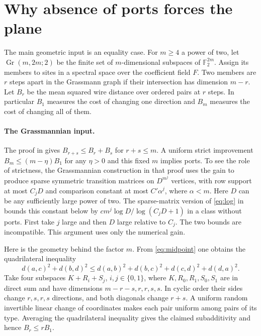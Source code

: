 \documentclass[11pt]{article}
\theoremstyle{definition}
\newcommand{\F}{\mathbb F}
\newcommand{\Gr}{\operatorname{Gr}}
\begin{document}
\appendix
\section{Why absence of ports forces the plane}
\label{app:plane}

The main geometric input is an equality case. For \(m\ge4\) a power of two,
let \(\Gr(m,2m;2)\) be the finite set of \(m\)-dimensional subspaces of
\(\F_2^{2m}\). Assign its members to sites in a spectral space over the
coefficient field \(F\). Two members are \(r\) steps apart in the
Grassmann graph if their intersection has dimension \(m-r\). Let \(B_r\)
be the mean squared wire distance over ordered pairs at \(r\) steps.
In particular \(B_1\) measures the cost of changing one direction and
\(B_m\) measures the cost of changing all of them.

\paragraph{The Grassmannian input.}
The proof in \cite{euclid} gives \(B_{r+s}\le B_r+B_s\) for
\(r+s\le m\). A uniform strict improvement \(B_m\le(m-\eta)B_1\) for any
\(\eta>0\) and this fixed \(m\) implies ports. To see the role of strictness,
the Grassmannian construction in that proof uses the gain to produce
sparse symmetric transition matrices on \(D^{m^j}\) vertices, with row
support at most \(C_jD\) and comparison constant at most \(C'\alpha^j\),
where \(\alpha<m\). Here \(D\) can be any sufficiently large power of two.
The sparse-matrix version of \eqref{eq:log} in \cite{circuits} bounds this
constant below by \(c m^j\log D/\log(C_jD+1)\) in a class without ports.
First take \(j\) large and then \(D\) large relative to \(C_j\). The two
bounds are incompatible. This argument uses only the numerical gain.

Here is the geometry behind the factor \(m\). From
\eqref{eq:midpoint} one obtains the quadrilateral inequality
\[
 d(a,c)^2+d(b,d)^2\le
 d(a,b)^2+d(b,c)^2+d(c,d)^2+d(d,a)^2 .
\]
Take four subspaces \(K+R_i+S_j\), \(i,j\in\{0,1\}\), where
\(K,R_0,R_1,S_0,S_1\) are in direct sum and have dimensions
\(m-r-s,r,r,s,s\). In cyclic order their sides change \(r,s,r,s\)
directions, and both diagonals change \(r+s\). A uniform random invertible
linear change of coordinates makes each pair uniform among pairs of its
type. Averaging the quadrilateral inequality gives the claimed
subadditivity and hence \(B_r\le rB_1\).
\end{document}
